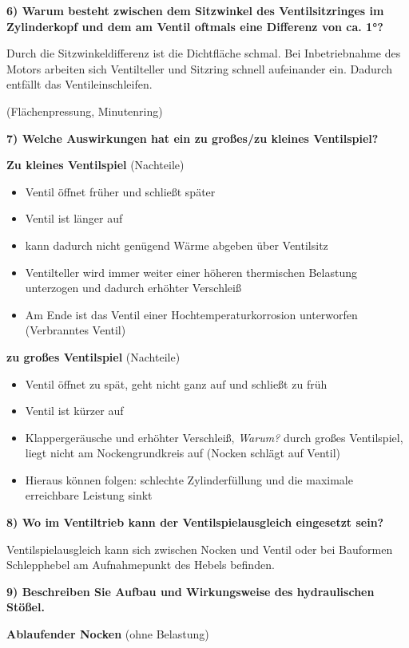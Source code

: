 \textbf{6) Warum besteht zwischen dem Sitzwinkel des Ventilsitzringes im
Zylinderkopf und dem am Ventil oftmals eine Differenz von ca. 1°?}

Durch die Sitzwinkeldifferenz ist die Dichtfläche schmal. Bei
Inbetriebnahme des Motors arbeiten sich Ventilteller und Sitzring
schnell aufeinander ein. Dadurch entfällt das Ventileinschleifen.

(Flächenpressung, Minutenring)

\textbf{7) Welche Auswirkungen hat ein zu großes/zu kleines
Ventilspiel?}

\textbf{Zu kleines Ventilspiel} (Nachteile)

\begin{itemize}
\item
  Ventil öffnet früher und schließt später
\item
  Ventil ist länger auf
\item
  kann dadurch nicht genügend Wärme abgeben über Ventilsitz
\item
  Ventilteller wird immer weiter einer höheren thermischen Belastung
  unterzogen und dadurch erhöhter Verschleiß
\item
  Am Ende ist das Ventil einer Hochtemperaturkorrosion unterworfen
  (Verbranntes Ventil)
\end{itemize}

\textbf{zu großes Ventilspiel} (Nachteile)

\begin{itemize}
\item
  Ventil öffnet zu spät, geht nicht ganz auf und schließt zu früh
\item
  Ventil ist kürzer auf
\item
  Klappergeräusche und erhöhter Verschleiß, \emph{Warum?} durch großes
  Ventilspiel, liegt nicht am Nockengrundkreis auf (Nocken schlägt auf
  Ventil)
\item
  Hieraus können folgen: schlechte Zylinderfüllung und die maximale
  erreichbare Leistung sinkt
\end{itemize}

\textbf{8) Wo im Ventiltrieb kann der Ventilspielausgleich eingesetzt
sein?}

Ventilspielausgleich kann sich zwischen Nocken und Ventil oder bei
Bauformen Schlepphebel am Aufnahmepunkt des Hebels befinden.

\textbf{9) Beschreiben Sie Aufbau und Wirkungsweise des hydraulischen
Stößel.}

\textbf{Ablaufender Nocken} (ohne Belastung)

